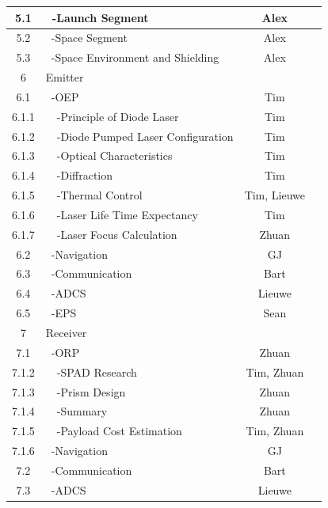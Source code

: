 \begin{center}
\begin{longtable}{|c|l|c|c|}
 5.1     & \ -Launch Segment                    & Alex &\\\hline
 5.2     & \ -Space Segment                     & Alex &\\\hline
 5.3     & \ -Space Environment and Shielding   & Alex &\\\hline\hline
 6       & Emitter                              &&\\\hline
 6.1     & \ -OEP                               & Tim &\\\hline
 6.1.1   & \ \ -Principle of Diode Laser       & Tim &\\\hline
 6.1.2   & \ \ -Diode Pumped Laser Configuration & Tim &\\\hline
 6.1.3   & \ \ -Optical Characteristics        & Tim &\\\hline
 6.1.4   & \ \ -Diffraction                    & Tim &\\\hline  
 6.1.5   & \ \ -Thermal Control                & Tim, Lieuwe &\\\hline
 6.1.6   & \ \ -Laser Life Time Expectancy     & Tim &\\\hline
 6.1.7   & \ \ -Laser Focus Calculation        & Zhuan &\\\hline
 6.2     & \ -Navigation                        & GJ &\\\hline
 6.3     & \ -Communication                     & Bart &\\\hline
 6.4     & \ -ADCS                              & Lieuwe &\\\hline
 6.5     & \ -EPS                               & Sean &\\\hline
 7       & Receiver                             &&\\\hline
 7.1     & \ -ORP                               & Zhuan &\\\hline
 7.1.2   & \ \ -SPAD Research                  & Tim, Zhuan &\\\hline
 7.1.3   & \ \ -Prism Design                   & Zhuan &\\\hline
 7.1.4   & \ \ -Summary                        & Zhuan &\\\hline
 7.1.5   & \ \ -Payload Cost Estimation        & Tim, Zhuan &\\\hline
 7.1.6   & \ -Navigation                        & GJ &\\\hline
 7.2     & \ -Communication                     & Bart &\\\hline
 7.3     & \ -ADCS                              & Lieuwe &\\\hline

\end{longtable}
\end{center}
